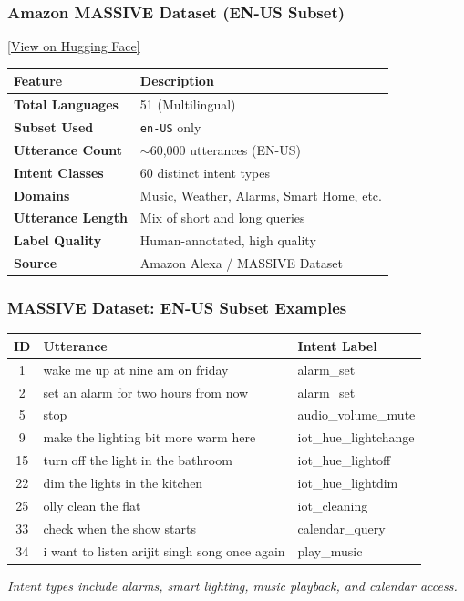 \documentclass{beamer}
\begin{document}
\begin{frame}
  \frametitle{Amazon MASSIVE Dataset (EN-US Subset)}

  {\footnotesize \href{https://huggingface.co/datasets/SetFit/amazon_massive_intent_en-US}{[View on Hugging Face]}}
  \vspace{1em}

  \centering
  \begin{tabular}{ll}
  \toprule
  \textbf{Feature} & \textbf{Description} \\
  \midrule
  \textbf{Total Languages} & 51 (Multilingual) \\
  \textbf{Subset Used} & \texttt{en-US} only \\
  \textbf{Utterance Count} & $\sim$60,000 utterances (EN-US) \\
  \textbf{Intent Classes} & 60 distinct intent types \\
  \textbf{Domains} & Music, Weather, Alarms, Smart Home, etc. \\
  \textbf{Utterance Length} & Mix of short and long queries \\
  \textbf{Label Quality} & Human-annotated, high quality \\
  \textbf{Source} & Amazon Alexa / MASSIVE Dataset \\
  \bottomrule
  \end{tabular}
  
\end{frame}

\begin{frame}
  \frametitle{MASSIVE Dataset: EN-US Subset Examples}
  
  \vspace{0.5em}
  \centering
  \scriptsize
  \begin{tabular}{cll}
  \toprule
  \textbf{ID} & \textbf{Utterance} & \textbf{Intent Label} \\
  \midrule
  1   & wake me up at nine am on friday     & alarm\_set \\
  2   & set an alarm for two hours from now & alarm\_set \\
  5   & stop                                & audio\_volume\_mute \\
  9   & make the lighting bit more warm here & iot\_hue\_lightchange \\
  15  & turn off the light in the bathroom  & iot\_hue\_lightoff \\
  22  & dim the lights in the kitchen       & iot\_hue\_lightdim \\
  25  & olly clean the flat                 & iot\_cleaning \\
  33  & check when the show starts          & calendar\_query \\
  34  & i want to listen arijit singh song once again & play\_music \\
  \bottomrule
  \end{tabular}
  \vspace{1em}
  
  \textit{Intent types include alarms, smart lighting, music playback, and calendar access.}
  \end{frame}
\end{document}
